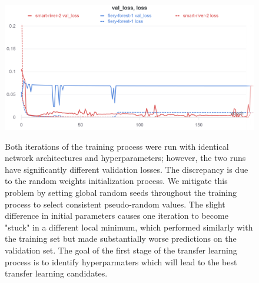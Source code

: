 \begin{figure}
    \centering
    \includegraphics[width=\linewidth]{Chapters/Figures/best-params-meta1.png}
    \label{fig:meta-1-best}
    \caption[Hyperpamater Sweep 2]{Both iterations of the training process were run with identical network architectures and hyperparameters; however, the two runs have significantly different validation losses. The discrepancy is due to the random weights initialization process. We mitigate this problem by setting global random seeds throughout the training process to select consistent pseudo-random values. The slight difference in initial parameters causes one iteration to become "stuck" in a different local minimum, which performed similarly with the training set but made substantially worse predictions on the validation set. The goal of the first stage of the transfer learning process is to identify hyperparmaters which will lead to the best transfer learning candidates.}
\end{figure}

